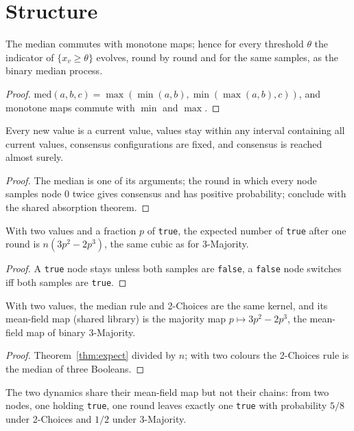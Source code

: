 \section{Structure}
\begin{theorem}\label{thm:threshold}
\leanok{}
The median commutes with monotone maps; hence for every threshold $\theta$ the indicator of
$\{x_v\ge\theta\}$ evolves, round by round and for the same samples, as the binary median process.
\end{theorem}
\begin{proof}\leanok
$\mathrm{med}(a,b,c)=\max(\min(a,b),\min(\max(a,b),c))$, and monotone maps commute with $\min$ and $\max$.
\end{proof}
\begin{theorem}\label{thm:basic}
\leanok{}
Every new value is a current value, values stay within any interval containing all current
values, consensus configurations are fixed, and consensus is reached almost surely.
\end{theorem}
\begin{proof}\leanok
The median is one of its arguments; the round in which every node samples node $0$ twice gives
consensus and has positive probability; conclude with the shared absorption theorem.
\end{proof}
\begin{theorem}\label{thm:expect}
\leanok{}
With two values and a fraction $p$ of \texttt{true}, the expected number of \texttt{true} after one
round is $n(3p^2-2p^3)$, the same cubic as for 3-Majority.
\end{theorem}
\begin{proof}\leanok
A \texttt{true} node stays unless both samples are \texttt{false}, a \texttt{false} node switches iff
both samples are \texttt{true}.
\end{proof}
\begin{theorem}\label{thm:mean-field}
\leanok{}
With two values, the median rule and 2-Choices are the same kernel, and its mean-field map (shared
library) is the majority map $p\mapsto3p^2-2p^3$, the mean-field map of binary 3-Majority.
\end{theorem}
\begin{proof}\leanok
Theorem~\ref{thm:expect} divided by $n$; with two colours the 2-Choices rule is the median of
three Booleans.
\end{proof}
The two dynamics share their mean-field map but not their chains: from two nodes, one holding
\texttt{true}, one round leaves exactly one \texttt{true} with probability $5/8$ under 2-Choices and
$1/2$ under 3-Majority.

